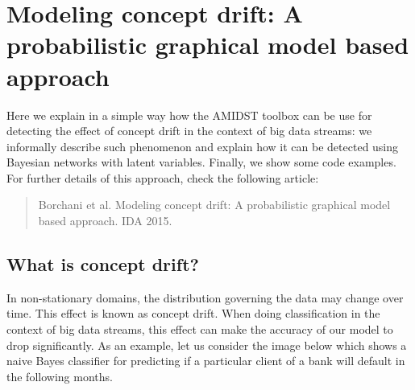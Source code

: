 \documentclass[10pt,a4paper]{article}
\begin{document}
\section{Modeling concept drift: A probabilistic graphical model based approach
}\label{sec:blog_conceptdrift}

Here we explain in a simple way how the AMIDST toolbox can be use for detecting the effect of concept drift in the context of big data streams: we informally describe such phenomenon and explain how it can be detected using Bayesian networks with latent variables. Finally, we show some code examples. For further details of this approach, check the following article:

\begin{quotation}
Borchani et al. Modeling concept drift: A probabilistic graphical model based approach. IDA 2015.
\end{quotation}


\subsection{What is concept drift?}\label{sec:blog_conceptdrift:what}

In non-stationary domains, the distribution governing the data may change over time. This effect is known as concept drift. When doing classification in the context of big data streams, this effect can make the accuracy of our model to drop significantly. As an example, let us consider the image below which shows a naive Bayes classifier for predicting if a particular client of a bank will default in the following months.  
\end{document}
